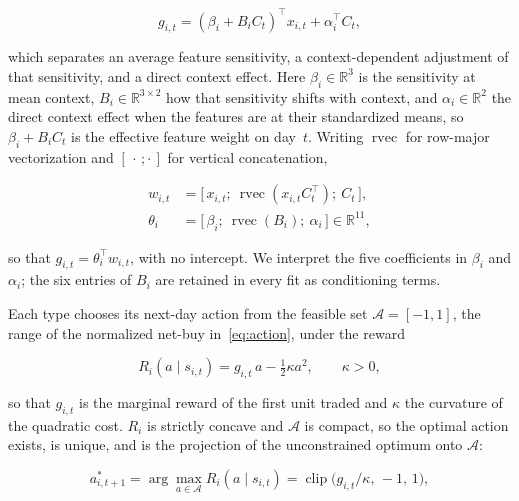\documentclass[sigconf,anonymous,review]{acmart}
\begin{document}
\begin{equation}
  \label{eq:gradient}
  g_{i,t} = (\beta_i + B_i C_t)^{\top} x_{i,t} + \alpha_i^{\top} C_t ,
\end{equation}

which separates an average feature sensitivity, a context-dependent
adjustment of that sensitivity, and a direct context effect. Here
$\beta_i \in \mathbb{R}^3$ is the sensitivity at mean context,
$B_i \in \mathbb{R}^{3 \times 2}$ how that sensitivity shifts with
context, and $\alpha_i \in \mathbb{R}^2$ the direct context effect when
the features are at their standardized means, so $\beta_i + B_i C_t$ is
the effective feature weight on day~$t$. Writing $\operatorname{rvec}$
for row-major vectorization and $[\,\cdot\,;\cdot\,]$ for vertical
concatenation,

\begin{equation}
  \label{eq:vec}
  \begin{aligned}
    w_{i,t} &= \bigl[\, x_{i,t};\ \operatorname{rvec}(x_{i,t} C_t^{\top});\ C_t \,\bigr], \\
    \theta_i &= \bigl[\, \beta_i;\ \operatorname{rvec}(B_i);\ \alpha_i \,\bigr]
      \in \mathbb{R}^{11},
  \end{aligned}
\end{equation}

so that $g_{i,t} = \theta_i^{\top} w_{i,t}$, with no intercept. We
interpret the five coefficients in $\beta_i$ and $\alpha_i$; the six
entries of $B_i$ are retained in every fit as conditioning terms.

Each type chooses its next-day action from the feasible set
$\mathcal{A} = [-1, 1]$, the range of the normalized net-buy
in~\eqref{eq:action}, under the reward

\begin{equation}
  \label{eq:reward}
  R_i(a \mid s_{i,t}) = g_{i,t}\, a - \tfrac{1}{2}\kappa a^2,
  \qquad \kappa > 0,
\end{equation}

so that $g_{i,t}$ is the marginal reward of the first unit traded and
$\kappa$ the curvature of the quadratic cost. $R_i$ is strictly concave
and $\mathcal{A}$ is compact, so the optimal action exists, is unique,
and is the projection of the unconstrained optimum onto $\mathcal{A}$:

\begin{equation}
  \label{eq:optimal}
  a^{*}_{i,t+1} = \arg\max_{a \in \mathcal{A}} R_i(a \mid s_{i,t})
  = \operatorname{clip}\!\bigl(g_{i,t}/\kappa,\, -1,\, 1\bigr),
\end{equation}
\end{document}
